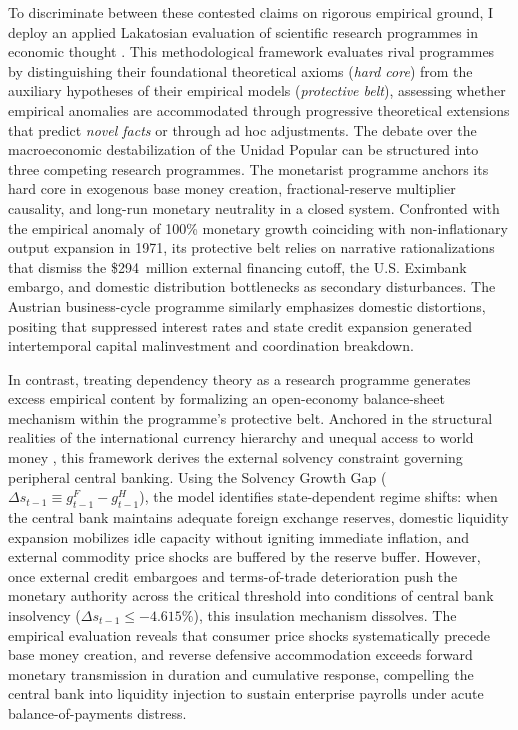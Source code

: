 To discriminate between these contested claims on rigorous empirical ground, I deploy an applied Lakatosian evaluation of scientific research programmes in economic thought \citep{Lakatos1978,KingSznajder2006,Kvangraven2021}. This methodological framework evaluates rival programmes by distinguishing their foundational theoretical axioms (\emph{hard core}) from the auxiliary hypotheses of their empirical models (\emph{protective belt}), assessing whether empirical anomalies are accommodated through progressive theoretical extensions that predict \emph{novel facts} or through ad hoc adjustments. The debate over the macroeconomic destabilization of the Unidad Popular can be structured into three competing research programmes. The monetarist programme \citep{Edwards2024} anchors its hard core in exogenous base money creation, fractional-reserve multiplier causality, and long-run monetary neutrality in a closed system. Confronted with the empirical anomaly of 100\% monetary growth coinciding with non-inflationary output expansion in 1971, its protective belt relies on narrative rationalizations that dismiss the \$294~million external financing cutoff, the U.S. Eximbank embargo, and domestic distribution bottlenecks as secondary disturbances. The Austrian business-cycle programme \citep{EspinosaVejar2025} similarly emphasizes domestic distortions, positing that suppressed interest rates and state credit expansion generated intertemporal capital malinvestment and coordination breakdown.

In contrast, treating dependency theory as a research programme \citep{Kvangraven2021} generates excess empirical content by formalizing an open-economy balance-sheet mechanism within the programme's protective belt. Anchored in the structural realities of the international currency hierarchy and unequal access to world money \citep{Vasudevan2009,Basu2022}, this framework derives the external solvency constraint governing peripheral central banking. Using the Solvency Growth Gap ($\Delta s_{t-1} \equiv g^F_{t-1} - g^H_{t-1}$), the model identifies state-dependent regime shifts: when the central bank maintains adequate foreign exchange reserves, domestic liquidity expansion mobilizes idle capacity without igniting immediate inflation, and external commodity price shocks are buffered by the reserve buffer. However, once external credit embargoes and terms-of-trade deterioration push the monetary authority across the critical threshold into conditions of central bank insolvency ($\Delta s_{t-1} \le -4.615\%$), this insulation mechanism dissolves. The empirical evaluation reveals that consumer price shocks systematically precede base money creation, and reverse defensive accommodation exceeds forward monetary transmission in duration and cumulative response, compelling the central bank into liquidity injection to sustain enterprise payrolls under acute balance-of-payments distress.


